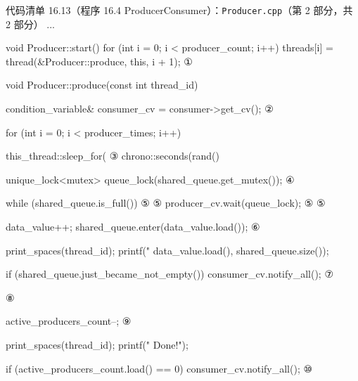 \begin{codeboxt}{代码清单 16.13（程序 16.4 ProducerConsumer）：\texttt{Producer.\allowbreak{}cpp}（第 2 部分，共 2 部分）}
...

void Producer::start()
{
    for (int i = 0; i < producer_count; i++)
    {
        threads[i] = thread(&Producer::produce, this, i + 1);        ①
    }
}

void Producer::produce(const int thread_id)
{
    condition_variable& consumer_cv = consumer->get_cv();            ②

    for (int i = 0; i < producer_times; i++)
    {
        this_thread::sleep_for(                                      ③
                            chrono::seconds(rand()%

        {
            unique_lock<mutex> queue_lock(shared_queue.get_mutex()); ④
            {
                while (shared_queue.is_full())                       ⑤
                {                                                    ⑤
                    producer_cv.wait(queue_lock);                    ⑤
                }                                                    ⑤

                data_value++;
                shared_queue.enter(data_value.load());               ⑥

                print_spaces(thread_id);
                printf("%
                       data_value.load(), shared_queue.size());

                if (shared_queue.just_became_not_empty())
                {
                    consumer_cv.notify_all();                        ⑦
                }
            }
        }                                                            ⑧
    }

    active_producers_count--;                                        ⑨

    print_spaces(thread_id);
    printf("   Done!\n");

    if (active_producers_count.load() == 0)
    {
        consumer_cv.notify_all();                                    ⑩
    }
}
\end{codeboxt}
\par
{}\par
{}\par
{}\par
